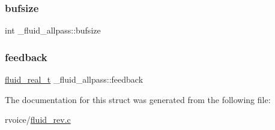 \mbox{\label{struct__fluid__allpass_afb12081fc279dc74ec419e1595a67a2d}} 
\subsubsection{\texorpdfstring{bufsize}{bufsize}}
{\footnotesize\ttfamily int \+\_\+fluid\+\_\+allpass\+::bufsize}

\mbox{\label{struct__fluid__allpass_aa8d930d5f1a494a6a706549e89838521}} 
\subsubsection{\texorpdfstring{feedback}{feedback}}
{\footnotesize\ttfamily \hyperlink{fluidsynth__priv_8h_a9e96f0917747b69cabb7c671bc693dbb}{fluid\+\_\+real\+\_\+t} \+\_\+fluid\+\_\+allpass\+::feedback}



The documentation for this struct was generated from the following file\+:\begin{DoxyCompactItemize}
\item 
rvoice/\hyperlink{fluid__rev_8c}{fluid\+\_\+rev.\+c}\end{DoxyCompactItemize}
